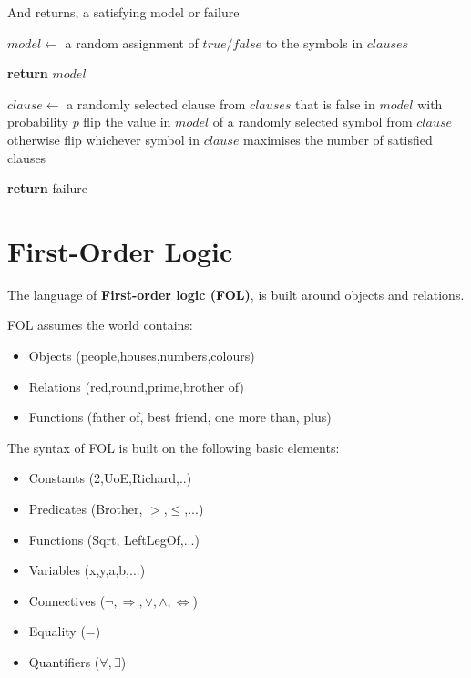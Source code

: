 \documentclass{article}
\begin{document}
And returns, a satisfying model or failure

\begin{algorithm}
\begin{algorithmic}

    \State $model \leftarrow$ a random assignment of $true/false$ to the symbols in $clauses$

        \State \textbf{return} $model$
    \EndIf

    \State $clause \leftarrow$ a randomly selected clause from $clauses$ that is false in $model$ with probability $p$ flip the value in $model$ of a randomly selected symbol from $clause$ otherwise flip whichever symbol in $clause$ maximises the number of satisfied clauses
    
    \EndFor
    \State \textbf{return} failure
\EndProcedure \newline

\end{algorithmic}
\end{algorithm}

\section{First-Order Logic}

The language of \textbf{First-order logic (FOL)}, is built around objects and relations.

FOL assumes the world contains:
\begin{itemize}
    \item Objects (people,houses,numbers,colours)
    \item Relations (red,round,prime,brother of)
    \item Functions (father of, best friend, one more than, plus)
\end{itemize}

The syntax of FOL is built on the following basic elements:
\begin{itemize}
    \item Constants (2,UoE,Richard,..)
    \item Predicates (Brother, $>$,$\leq$,...)
    \item Functions (Sqrt, LeftLegOf,...)
    \item Variables (x,y,a,b,...)
    \item Connectives ($\neg, \Rightarrow,\vee, \wedge, \Leftrightarrow$)
    \item Equality (=)
    \item Quantifiers ($\forall,\exists$)
\end{itemize}
\end{document}
